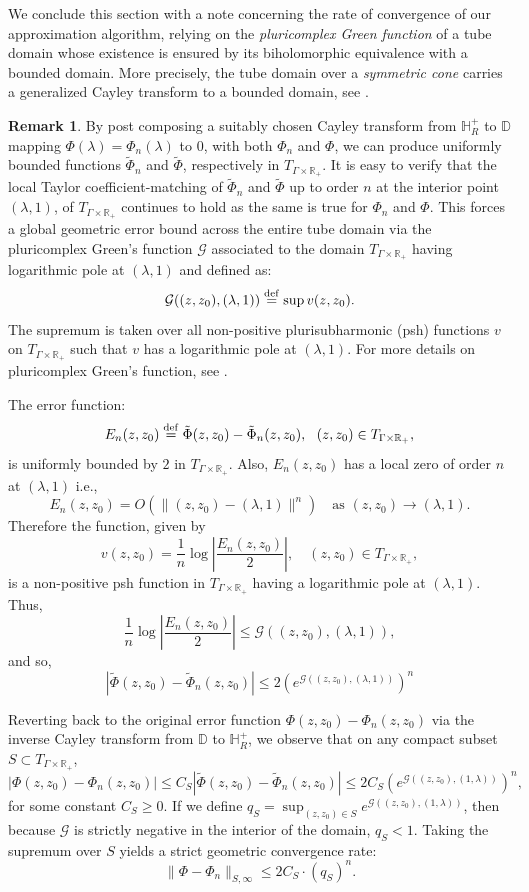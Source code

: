 \documentclass[11pt,reqno]{amsart}
\theoremstyle{plain}
\theoremstyle{definition}
\newtheorem{remark}[theorem]{Remark}
\numberwithin{equation}{section}
\newcommand{\bydef}{\stackrel{\rm def}{=}}
\begin{document}
      We conclude this section with a note concerning the rate of convergence of our approximation algorithm, relying on the {\em pluricomplex Green function} of a tube domain whose existence is ensured by its biholomorphic equivalence with a bounded domain. More precisely, the tube domain over a {\it symmetric cone} carries a generalized Cayley transform to a bounded domain, see \cite[Chapter X]{Faraut-Koranyi}.
\begin{remark}
By post composing a suitably chosen Cayley transform from $\mathbb{H}^+_R$ to $\mathbb{D}$ mapping $\Phi(\lambda)=\Phi_n(\lambda)$ to $0$, with both $\Phi_n$ and $\Phi$, we can produce uniformly bounded functions $\tilde{\Phi}_n$ and $\tilde{\Phi}$, respectively in $T_{\Gamma \times \mathbb{R}_+}$. It is easy to verify that the local Taylor coefficient-matching of $\tilde{\Phi}_n$ and $\tilde{\Phi}$ up to order $n$ at the interior point $(\lambda, 1)$, of $T_{\Gamma \times \mathbb{R}_+}$ continues to hold as the same is true for $\Phi_n$ and $\Phi$.
This forces a global geometric error bound across the entire tube domain via the pluricomplex Green's function $\mathcal{G}$ associated to the domain $T_{\Gamma \times \mathbb{R}_+}$ having logarithmic pole at $(\lambda, 1)$ and defined as:
$$\mathcal{G}((z, z_0), (\lambda, 1)) \bydef \sup  v(z, z_0).$$
The supremum is taken over all non-positive plurisubharmonic (psh) functions $v$ on $T_{\Gamma \times \mathbb{R}_+}$ such that $v$ has a logarithmic pole at $(\lambda, 1)$.
For more details on pluricomplex Green's function, see \cite[Chapter 6]{Klimek}.

The error function:
$$E_n(z, z_0) \bydef \tilde{\Phi}(z, z_0) - \tilde{\Phi}_n(z, z_0), \ \ (z, z_0)\in T_{\Gamma \times \mathbb{R}_+},$$
is uniformly bounded by $2$ in $T_{\Gamma \times \mathbb{R}_+}$.
Also, $E_n(z, z_0)$ has a local zero of order $n$ at $(\lambda, 1)$ i.e.,
$$E_n(z, z_0) = O(\|(z, z_0) - (\lambda, 1)\|^n) \quad \text{as } (z, z_0) \to (\lambda, 1).$$
Therefore the function, given by
$$v(z, z_0) = \frac{1}{n} \log \left| \frac{E_n(z, z_0)}{2} \right|, \quad (z, z_0)\in T_{\Gamma \times \mathbb{R}_+},$$
is a non-positive psh function in $T_{\Gamma \times \mathbb{R}_+}$ having a logarithmic pole at $(\lambda, 1)$. Thus,
$$\frac{1}{n} \log \left| \frac{E_n(z, z_0)}{2} \right| \le \mathcal{G}((z, z_0), (\lambda, 1)),$$
and so,
$$|\tilde{\Phi}(z, z_0) - \tilde{\Phi}_n(z, z_0)| \le 2 \left( e^{\mathcal{G}((z, z_0), (\lambda, 1))} \right)^n$$

Reverting back to the original error function $\Phi(z, z_0) - \Phi_n(z, z_0)$ via the inverse Cayley transform from $\mathbb{D}$ to $\mathbb{H}^+_R$, we observe that on any compact subset $S \subset T_{\Gamma \times \mathbb{R}_+}$, 
$$|\Phi(z, z_0) - \Phi_n(z, z_0)| \le C_S |\tilde{\Phi}(z, z_0) - \tilde{\Phi}_n(z, z_0)| \le 2 C_S \left( e^{\mathcal{G}((z, z_0), (1, \lambda))} \right)^n,$$
for some constant $C_S \geq 0$.
If we define $q_S = \sup_{(z, z_0) \in S}  e^{\mathcal{G}((z, z_0), (1, \lambda))}$, then because $\mathcal{G}$ is strictly negative in the interior of the domain, $q_S < 1$.
Taking the supremum over $S$ yields a strict geometric convergence rate:
$$\|\Phi - \Phi_n\|_{S, \infty} \le 2 C_S \cdot (q_S)^n.$$
\end{remark}
\end{document}
